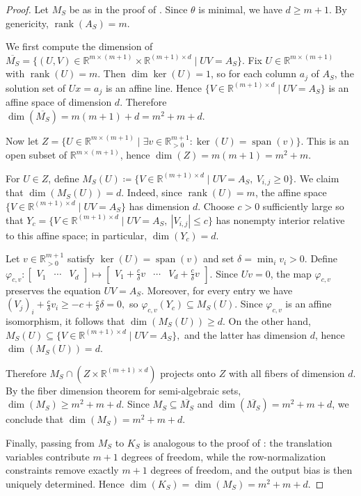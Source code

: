 \documentclass[10pt,a4paper]{amsart}
\DeclareMathOperator{\rank}{rank}
\newcommand{\R}{\mathbb{R}}
\begin{document}
\begin{proof}
Let $M_S$ be as in the proof of . Since $\theta$ is minimal, we have $d \geq m+1$. By genericity, $\rank(A_S) = m$. 

We first compute the dimension of
$
\overline{M_S}
=
\{(U,V)\in \R^{m\times (m+1)}\times \R^{(m+1)\times d}\mid UV=A_S\}.
$
Fix $U \in \R^{m \times (m+1)}$ with $\rank(U)=m$. Then $\dim\ker(U)=1$, so for each column $a_j$ of $A_S$, the solution set of $Ux=a_j$ is an affine line. Hence
$
\{V \in \R^{(m+1) \times d} \mid UV =A_S\}
$
is an affine space of dimension $d$. Therefore
$
\dim(\overline{M_S}) = m(m+1)+d= m^2 + m +d.
$

Now let
$
Z= \{ U \in \R^{m \times (m+1)} \mid \exists v \in \R^{m+1}_{>0}:  \ker(U) = \operatorname{span}(v)\}.
$
This is an open subset of $\R^{m\times (m+1)}$, hence
$
\dim(Z)=m(m+1)=m^2+m.
$

For $U \in Z$, define
$
M_S(U) \coloneqq \{V \in \R^{(m+1) \times d} \mid UV =A_S ,\ V_{i,j} \geq 0\}.
$
We claim that $\dim(M_S(U))=d$. Indeed, since $\rank(U)=m$, the affine space
$
\{V \in \R^{(m+1) \times d} \mid UV =A_S\}
$
has dimension $d$. Choose $c>0$ sufficiently large so that
$
Y_c = \{V \in \R^{(m+1) \times d} \mid UV =A_S ,\ |V_{i,j}| \leq c\}
$
has nonempty interior relative to this affine space; in particular, $\dim(Y_c)=d$.

Let $v\in \R^{m+1}_{> 0}$ satisfy $\ker(U) = \operatorname{span}(v)$ and set
$
\delta = \min_i v_i >0.
$
Define
$
\varphi_{c,v}\colon
\begin{bmatrix}
V_1 & \cdots & V_d
\end{bmatrix}
\mapsto
\begin{bmatrix}
V_1 + \frac{c}{\delta}v & \cdots & V_d +\frac{c}{\delta}v
\end{bmatrix}.
$
Since $Uv=0$, the map $\varphi_{c,v}$ preserves the equation $UV=A_S$. Moreover, for every entry we have
$
(V_j)_i + \frac{c}{\delta}v_i \ge -c + \frac{c}{\delta}\delta =0,
$
so $\varphi_{c,v}(Y_c) \subseteq M_S(U)$. Since $\varphi_{c,v}$ is an affine isomorphism, it follows that
$
\dim(M_S(U)) \ge d.
$
On the other hand,
$
M_S(U)\subseteq \{V\in \R^{(m+1)\times d}\mid UV=A_S\},
$
and the latter has dimension $d$, hence $\dim(M_S(U))=d$.

Therefore
$
M_S\cap (Z\times \R^{(m+1)\times d})
$
projects onto $Z$ with all fibers of dimension $d$. By the fiber dimension theorem for semi-algebraic sets,
$
\dim(M_S)\ge m^2+m+d.
$
Since $M_S\subseteq \overline{M_S}$ and $\dim(\overline{M_S})=m^2+m+d$, we conclude that
$
\dim(M_S)=m^2+m+d.
$

Finally, passing from $M_S$ to $K_S$ is analogous to the proof of : the translation variables contribute $m+1$ degrees of freedom, while the row-normalization constraints remove exactly $m+1$ degrees of freedom, and the output bias is then uniquely determined. Hence 
$\dim(K_S)=\dim(M_S)=m^2+m+d$. 
%
\end{proof}
\end{document}
